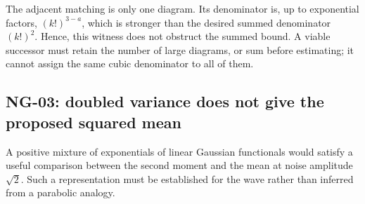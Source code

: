 The adjacent matching is only one diagram. Its denominator is, up to
exponential factors, $(k!)^{3-a}$, which is stronger than the desired
summed denominator $(k!)^2$. Hence, this witness does not obstruct the
summed bound. A viable successor must retain the number of large diagrams,
or sum before estimating; it cannot assign the same cubic denominator to
all of them.

\subsection[NG-03: a squared-mean comparison fails]{NG-03: doubled variance does not give the proposed squared mean}
\label{S:nogo-03}

A positive mixture of exponentials of linear Gaussian functionals would
satisfy a useful comparison between the second moment and the mean at
noise amplitude $\sqrt2$. Such a representation must be established for
the wave rather than inferred from a parabolic analogy.

